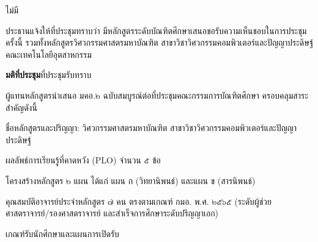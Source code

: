 \documentclass{meetingminutes}
\begin{document}
\maketitle

\begin{participants}
\end{participants}

\noindent ไม่มี\par

\startmeeting
{}


ประธานแจ้งให้ที่ประชุมทราบว่า มีหลักสูตรระดับบัณฑิตศึกษาเสนอขอรับความเห็นชอบในการประชุมครั้งนี้
รวมทั้งหลักสูตรวิศวกรรมศาสตรมหาบัณฑิต สาขาวิชาวิศวกรรมคอมพิวเตอร์และปัญญาประดิษฐ์
คณะเทคโนโลยีอุตสาหกรรม

\noindent\textbf{มติที่ประชุม}\quad ที่ประชุมรับทราบ


ผู้แทนหลักสูตรนำเสนอ มคอ.๒ ฉบับสมบูรณ์ต่อที่ประชุมคณะกรรมการบัณฑิตศึกษา
ครอบคลุมสาระสำคัญดังนี้

\begin{thailist}
  \item ชื่อหลักสูตรและปริญญา: วิศวกรรมศาสตรมหาบัณฑิต สาขาวิชาวิศวกรรมคอมพิวเตอร์และปัญญาประดิษฐ์
  \item ผลลัพธ์การเรียนรู้ที่คาดหวัง (PLO) จำนวน ๕ ข้อ
  \item โครงสร้างหลักสูตร ๒ แผน ได้แก่ แผน ก (วิทยานิพนธ์) และแผน ข (สารนิพนธ์)
  \item คุณสมบัติอาจารย์ประจำหลักสูตร ๗ คน ตรงตามเกณฑ์ กมอ. พ.ศ. ๒๕๖๕
  (ระดับผู้ช่วยศาสตราจารย์/รองศาสตราจารย์ และสำเร็จการศึกษาระดับปริญญาเอก)
  \item เกณฑ์รับนักศึกษาและแผนการเปิดรับ
\end{thailist}
\end{document}
